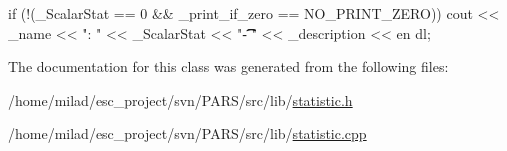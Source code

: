 \begin{DoxyCode}
                        {
    if (!(_ScalarStat == 0 && _print_if_zero == NO_PRINT_ZERO))
        cout << _name << ": " << _ScalarStat << "\t\t\t - " << _description << en
      dl;
}
\end{DoxyCode}


The documentation for this class was generated from the following files:\begin{DoxyCompactItemize}
\item 
/home/milad/esc\_\-project/svn/PARS/src/lib/\hyperlink{statistic_8h}{statistic.h}\item 
/home/milad/esc\_\-project/svn/PARS/src/lib/\hyperlink{statistic_8cpp}{statistic.cpp}\end{DoxyCompactItemize}
